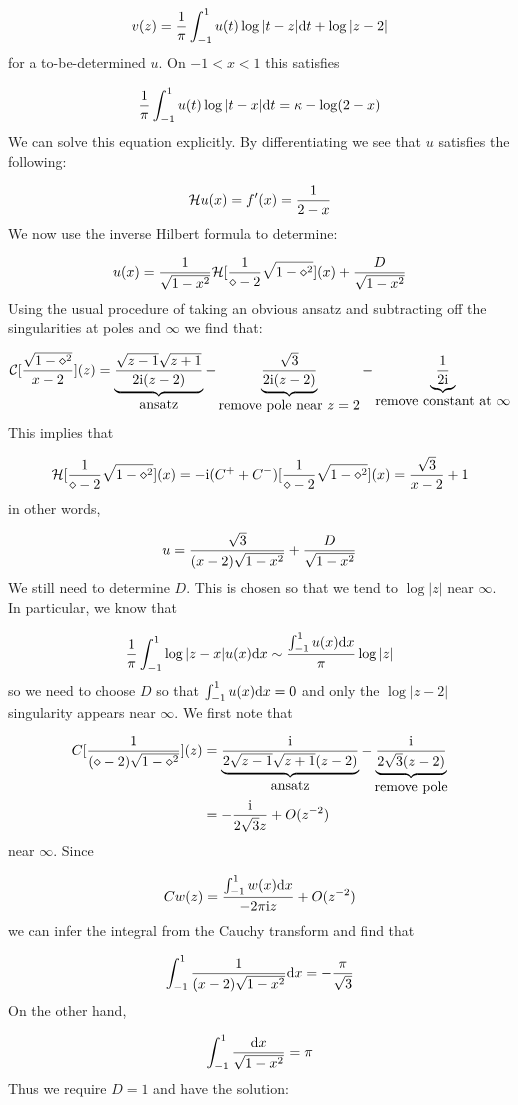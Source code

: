 \documentclass[12pt,landscape]{article}
\def\D{ {\rm d} }
\def\I{ {\rm i} }
\def\CC{ {\cal C} }
\def\HH{ {\cal H} }
\def\dx{\D x}
\def\dt{\D t}
\begin{document}
{\[
v(z) = {1 \over \pi} \int_{-1}^1 u(t) \log|t-z| \dt + \log|z-2|
\]
for a to-be-determined $u$. On $-1 < x < 1$ this satisfies

\[
 {1 \over \pi} \int_{-1}^1 u(t) \log|t-x| \dt  = \kappa - \log(2-x)
\]
We can solve this equation explicitly. By differentiating we see that $u$ satisfies the following:

\[
\HH u(x) = f'(x) = {1 \over 2-x}
\]
We now use the inverse Hilbert formula to determine:

\[
u(x) = {1\over\sqrt{1-x^2}} \HH [{1 \over \diamond-2} \sqrt{1-\diamond^2}](x) + {D \over \sqrt{1-x^2}}
\]
Using the usual procedure of taking an obvious ansatz and subtracting off the singularities at poles and $\infty$ we find that:

\[
\CC[{\sqrt{1-\diamond^2} \over x -2}](z) =
\underbrace{\sqrt{z-1} \sqrt{z+1} \over 2 \I (z-2)}_{\hbox{ansatz}} - \underbrace{\sqrt 3\over 2 \I (z-2)}_{\hbox{remove pole near $z=2$}} - \underbrace{{1 \over 2 \I}}_{\hbox{remove constant at $\infty$}}
\]
This implies that

\[
\HH[{1 \over\diamond-2} \sqrt{1-\diamond^2}](x) = -\I(C^+ + C^-)[{1 \over\diamond-2} \sqrt{1-\diamond^2}](x) = {\sqrt 3 \over x -2} + 1
\]
in other words,

\[
u = {\sqrt{3} \over (x - 2) \sqrt{1-x^2}} + {D \over \sqrt{1-x^2}}
\]
We still need to determine $D$. This is chosen so that we tend to $\log |z|$ near $\infty$. In particular, we know that

\[
{1 \over \pi} \int_{-1}^1 \log|z-x| u(x) \dx \sim  {\int_{-1}^1 u(x) \dx \over \pi}  \log |z|
\]
so we need to choose $D$ so that $\int_{-1}^1 u(x) \dx = 0$ and only the $\log|z-2|$ singularity appears near $\infty$. We first note that


\begin{align*}
C[{1 \over (\diamond - 2) \sqrt{1-\diamond^2}}](z) &= \underbrace{{\I \over 2 \sqrt{z-1} \sqrt{z+1} (z-2)}}_{\hbox{ansatz}} - \underbrace{{\I \over  2\sqrt{3} (z-2)}}_{\hbox{remove pole}} \\
& = -{\I \over 2 \sqrt{3} z} + O(z^{-2})
\end{align*}
near $\infty$. Since

\[
Cw(z)  ={ \int_{-1}^1 w(x) \dx \over -2\pi \I z} + O(z^{-2})
\]
we can  infer the integral from the Cauchy transform and find that

\[
\int_{-1}^1 {1 \over (x - 2) \sqrt{1-x^2}} \dx = -{ \pi \over \sqrt{3}}
\]
On the other hand,

\[
\int_{-1}^1 {\dx \over \sqrt{1-x^2}} = \pi
\]
Thus we require $D = 1$ and have the solution:

}
\end{document}
